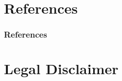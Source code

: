 \documentclass[9pt,pdftex]{beamer}
\begin{document}



\section{References}
\scriptsize
\begin{frame}
  \frametitle{References}
   
  
\end{frame}

\section{Legal Disclaimer}
\begin{frame}
  
\end{frame}
\end{document}
